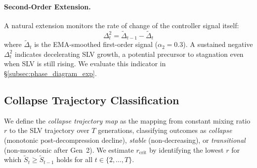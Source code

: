 \paragraph{Second-Order Extension.}
\label{subsec:second_order}
A natural extension monitors the rate of change of the controller signal itself:
\begin{equation}
\label{eq:second_order}
\Delta^2_t = \widetilde{\Delta}_{t-1} - \widetilde{\Delta}_t
\end{equation}
where $\widetilde{\Delta}_t$ is the EMA-smoothed first-order signal ($\alpha_2{=}0.3$).
A sustained negative $\Delta^2_t$ indicates decelerating SLV growth, a potential precursor to stagnation even when SLV is still rising.
We evaluate this indicator in \S\ref{subsec:phase_diagram_exp}.

\subsection{Collapse Trajectory Classification}
\label{subsec:phase_diagram}

We define the \emph{collapse trajectory map} as the mapping from constant mixing ratio $r$ to the SLV trajectory over $T$ generations, classifying outcomes as \emph{collapse} (monotonic post-decompression decline), \emph{stable} (non-decreasing), or \emph{transitional} (non-monotonic after Gen~2).
We estimate $r_{\text{crit}}$ by identifying the lowest $r$ for which $\widetilde{S}_t \geq \widetilde{S}_{t-1}$ holds for all $t \in \{2, \ldots, T\}$.
